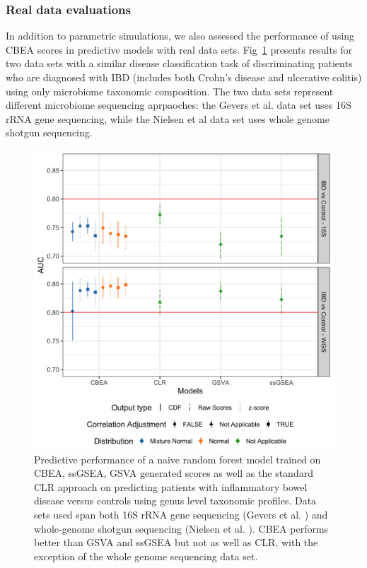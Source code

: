 \documentclass[10pt,letterpaper]{article}
\begin{document}
\subsubsection*{Real data evaluations}
In addition to parametric simulations, we also assessed the performance of using CBEA scores in predictive models with real data sets. Fig~\ref{fig:7} presents results for two data sets with a similar disease classification task of discriminating patients who are diagnosed with IBD (includes both Crohn's disease and ulcerative colitis) using only microbiome taxonomic composition. The two data sets represent different microbiome sequencing aprpaoches: the Gevers et al. \cite{gevers2014} data set uses 16S rRNA gene sequencing, while the Nielsen et al \cite{nielsen2014} data set uses whole genome shotgun sequencing. 

\begin{figure}[!h]
    \centering
    \includegraphics[width = \linewidth]{figures/data_prediction_plot.png}
    \caption{Predictive performance of a naive random forest model trained on CBEA, ssGSEA, GSVA generated scores as well as the standard CLR approach on predicting patients with inflammatory bowel disease versus controls using genus level taxonomic profiles. Data sets used span both 16S rRNA gene sequencing (Gevers et al. \cite{gevers2014}) and whole-genome shotgun sequencing (Nielsen et al. \cite{nielsen2014}). CBEA performs better than GSVA and ssGSEA but not as well as CLR, with the exception of the whole genome sequencing data set.}
    \label{fig:7}
\end{figure}
\end{document}
